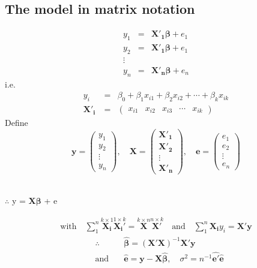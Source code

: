 \subsection{The model in matrix notation}
\begin{eqnarray*}
y_1 &=& \boldsymbol{X'_1\beta} + e_1\\
y_2 &=& \boldsymbol{X'_1\beta} + e_1\\
\vdots\\
y_n &=& \boldsymbol{X'_n\beta} + e_n
\end{eqnarray*}
i.e.
\begin{eqnarray*}
y_i &=& \beta_0 + \beta_1 x_{i1} + \beta_2 x_{i2} + \cdots + \beta_k x_{ik}\\
\boldsymbol{X'_i}\ &=& \begin{pmatrix}x_{i1} & x_{i2} & x_{i3} & \cdots & x_{ik}\end{pmatrix}
\end{eqnarray*}
Define
\[\boldsymbol{y}=\left( \begin{array}{c}
y_1\\
y_2\\
\vdots\\
y_n \end{array} \right), \quad \boldsymbol{X}=\left( \begin{array}{c}
\boldsymbol{X'_1}\\
\boldsymbol{X'_2}\\
\vdots\\
\boldsymbol{X'_n}\end{array} \right), \quad \boldsymbol{e}=\left( \begin{array}{c}
e_1\\
e_2\\
\vdots\\
e_n\end{array} \right)\]
\\
\begin{center}
$\therefore$ y = $\boldsymbol{X\beta}$ + e
\end{center}
\begin{eqnarray*}
\text{with}\quad\sum^n_1\overset{k\times1}{\boldsymbol{X_i}}\overset{1\times k}{\boldsymbol{X_i'}} = \overset{k\times n}{\boldsymbol{X}}\overset{n\times k}{\boldsymbol{X'}}\quad\text{and}\quad\sum^n_1\boldsymbol{X_{i}}y_i = \boldsymbol{X'y}
\end{eqnarray*}
\begin{eqnarray*}
&\therefore& \quad \boldsymbol{\hat{\beta}} = (\boldsymbol{X'X})^{-1}\boldsymbol{X'y}\\
&\text{and}& \quad \boldsymbol{\hat{e}} = \boldsymbol{y-X\hat{\beta}}, \quad\sigma^2 = n^{-1}\boldsymbol{\hat{e'}\hat{e}}
\end{eqnarray*}


